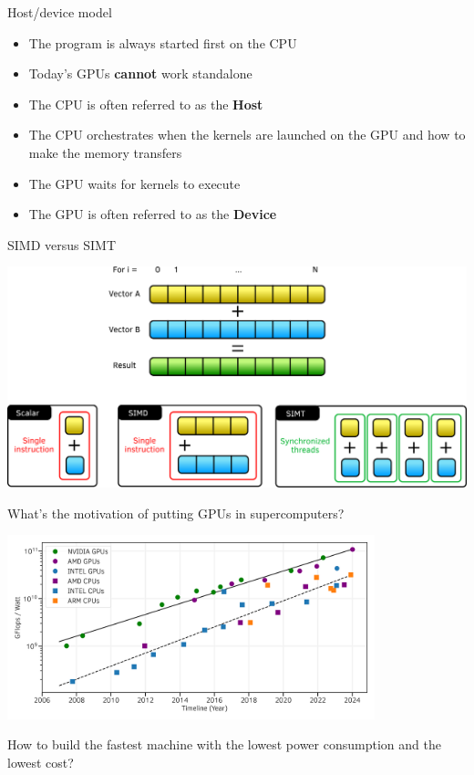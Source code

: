 \documentclass[aspectratio=169]{beamer}
\newcommand{\highlight}[1]{\textcolor{main}{\textbf{#1}}}
\begin{document}

\begin{frame}{Host/device model}
    \begin{itemize}
        \item The program is always started first on the CPU
        \item Today's GPUs \highlight{cannot} work standalone
        \item The CPU is often referred to as the \highlight{Host}
        \item The CPU orchestrates when the kernels are launched on the GPU and how to make the memory transfers
        \item The GPU waits for kernels to execute
        \item The GPU is often referred to as the \highlight{Device}
    \end{itemize}
\end{frame}


\begin{frame}{SIMD versus SIMT}
    \begin{center}
        \includegraphics[width=\textwidth]{SIMD_vs_SIMT.png}
    \end{center}
\end{frame}


\begin{frame}{What's the motivation of putting GPUs in supercomputers?}
    \begin{center}
        \includegraphics[width=0.8\textwidth]{flop_watt_ratio_history_fp64.png}
    \end{center}

     How to build the fastest machine with the lowest power consumption and the lowest cost?
\end{frame}
\end{document}
